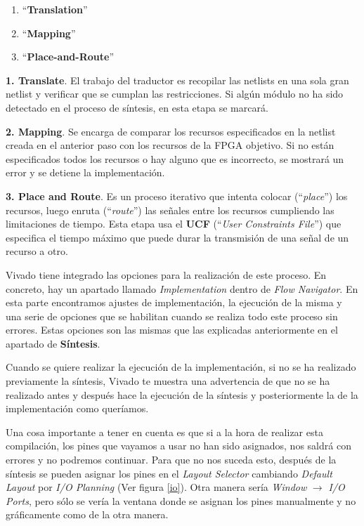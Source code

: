 \begin{enumerate}
    \item ``\textbf{Translation}''
    \item ``\textbf{Mapping}''
    \item ``\textbf{Place-and-Route}''
\end{enumerate}

\textbf{1. Translate}. El trabajo del traductor es recopilar las netlists en una sola gran netlist y 
verificar que se cumplan las restricciones. Si algún módulo no ha sido detectado en el proceso de síntesis, 
en esta etapa se marcará.

\textbf{2. Mapping}. Se encarga de comparar los recursos especificados en la netlist creada en el anterior paso 
con los recursos de la FPGA objetivo. Si no están especificados todos los recursos o hay alguno que es 
incorrecto, se mostrará un error y se detiene la implementación.

\textbf{3. Place and Route}. Es un proceso iterativo que intenta colocar (``\textit{place}'') los recursos, luego 
enruta (``\textit{route}'') las señales entre los recursos cumpliendo las limitaciones de tiempo. Esta etapa 
usa el \textbf{UCF} (``\textit{User Constraints File}'') que especifica el tiempo máximo que puede durar 
la transmisión de una señal de un recurso a otro.

Vivado tiene integrado las opciones para la realización de este proceso. En concreto, hay un apartado llamado 
\textit{Implementation} dentro de \textit{Flow Navigator}. En esta parte encontramos ajustes de implementación, 
la ejecución de la misma y una serie de opciones que se habilitan cuando se realiza todo este proceso sin errores. 
Estas opciones son las mismas que las explicadas anteriormente en el apartado de \textbf{Síntesis}. 

Cuando se quiere realizar la ejecución de la implementación, si no se ha realizado previamente la síntesis,
Vivado te muestra una advertencia de que no se ha realizado antes y después hace la ejecución de la síntesis 
y posteriormente la de la implementación como queríamos.

Una cosa importante a tener en cuenta es que si a la hora de realizar esta compilación, los pines que vayamos a 
usar no han sido asignados, nos saldrá con errores y no podremos continuar. Para que no nos suceda esto, después 
de la síntesis se pueden asignar los pines en el \textit{Layout Selector} cambiando \textit{Default Layout} por 
\textit{I/O Planning} (Ver figura \ref{io}). Otra manera sería \textit{Window} $\rightarrow$ \textit{I/O Ports}, 
pero sólo se vería la ventana donde se asignan los pines manualmente y no gráficamente como de la otra manera.

